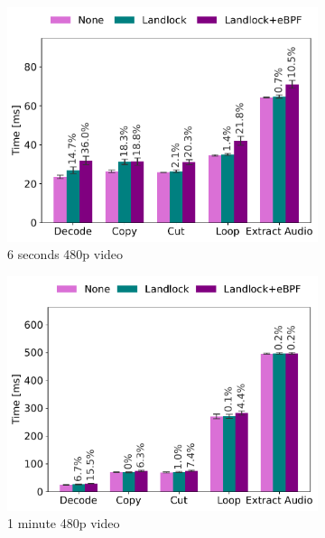 \begin{figure}[t!]
  \begin{subfigure}[b]{0.5\linewidth}
    \centering
    \includegraphics[width=\linewidth]{chapters/dmng/fig/ffmpeg_1.pdf}
    \caption{6 seconds 480p video}
    \label{fig:ffmpeg1-times}
  \end{subfigure}
  \begin{subfigure}[b]{0.5\linewidth}
    \centering
    \includegraphics[width=\linewidth]{chapters/dmng/fig/ffmpeg_10.pdf}
    \caption{1 minute 480p video}
    \label{fig:ffmpeg10-times}
  \end{subfigure}
  \begin{center}
    \begin{subfigure}[b]{0.5\linewidth}

\end{subfigure}
\end{center}
\end{figure}
